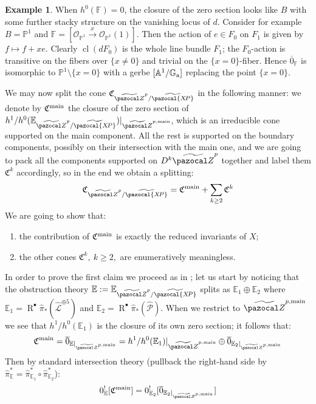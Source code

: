 \documentclass[11pt]{amsart}
\newcommand{\PP}{\mathbb P}
\newcommand{\OO}{\mathcal O}
\newcommand{\Aaff}{\mathbb A}
\newcommand{\tXP}{\widetilde{\pazocal{X\!P}}}
\newcommand{\hL}{\widehat{\mathcal L}}
\newcommand{\tZ}{\widetilde{\pazocal Z}}
\newcommand{\tZp}{\widetilde{\pazocal Z}^p}
\newcommand{\R}{\operatorname{R}}
\theoremstyle{plain}
\theoremstyle{definition}
\newtheorem{ex}[thm]{Example}
\begin{document}
\begin{ex}
When $h^0(\mathbb F)=0$, the closure of the zero section looks like $B$ with some further stacky structure on the vanishing locus of $d$. Consider for example $B=\PP^1$ and $\mathbb F=[\OO_{\PP^1}\xrightarrow{x}\OO_{\PP^1}(1)]$. Then the action of $e\in F_0$ on $F_1$ is given by $f\mapsto f+xe$. Clearly $\operatorname{cl}(dF_0)$ is the whole line bundle $F_1$; the $F_0$-action is transitive on the fibers over $\{x\neq 0\}$ and trivial on the $\{x=0\}$-fiber. Hence $\overline{0}_{\mathbb F}$ is isomorphic to $\PP^1\setminus\{x=0\}$ with a gerbe $[\Aaff^1/\mathbb G_{\rm a}]$ replacing the point $\{x=0\}$.
\end{ex}

We may now split the cone $\mathfrak{C}_{\tZp/\tXP}$ in the following manner: we denote by $\mathfrak C^{\rm{main}}$ the closure of the zero section of $h^1/h^0(\mathbb {E}_{\tZp/\tXP})\rvert_{\tZ^{p,\rm{main}}}$, which is an irreducible cone supported on the main component. All the rest is supported on the boundary components, possibly on their intersection with the main one, and we are going to pack all the components supported on $D^k\tZp$ together and label them $\mathfrak C^k$ accordingly, so in the end we obtain a splitting:
\[
 \mathfrak{C}_{\tZp/\tXP}=\mathfrak C^{\rm{main}}+\sum_{k\geq 2} \mathfrak C^k
\]
We are going to show that:
\begin{enumerate}
 \item the contribution of $\mathfrak C^{\rm{main}}$ is exactly the reduced invariants of $X$;
 \item the other cones $\mathfrak C^k,\ k\geq 2,$ are enumeratively meaningless.
\end{enumerate}

In order to prove the first claim we proceed as in \cite[\S5]{CLpfields}; let us start by noticing that the obstruction theory $\mathbb E:=\mathbb E_{\tZp/\tXP}$ splits as $\mathbb E_1\oplus\mathbb E_2$ where $\mathbb E_1=\R^{\bullet}\hat\pi_*(\hL^{\oplus 5})$ and $\mathbb E_2=\R^{\bullet}\hat\pi_*(\widehat{\mathcal P})$. When we restrict to $\tZ^{p,\rm{main}}$ we see that $h^1/h^0(\mathbb E_1)$ is the closure of its own zero section; it follows that:
\[
 \mathfrak C^{\rm{main}}=\overline{0}_{\mathbb E\rvert_{\tZ^{p,\rm{main}}}}=h^1/h^0(\mathbb E_1)\rvert_{\tZ^{p,\rm{main}}}\oplus \overline{0}_{\mathbb E_2\rvert_{\tZ^{p,\rm{main}}}}
\]
Then by standard intersection theory (pullback the right-hand side by $\hat\pi_{\mathbb E}^*=\hat\pi_{\mathbb E_1}^*\circ\hat\pi_{\mathbb E_2}^*$):
\[
 0^!_{\mathbb E}[\mathfrak C^{\rm{main}}]=0_{\mathbb E_2}^![\overline{0}_{\mathbb E_2\rvert_{\tZ^{p,\rm{main}}}}]
\]
\end{document}
